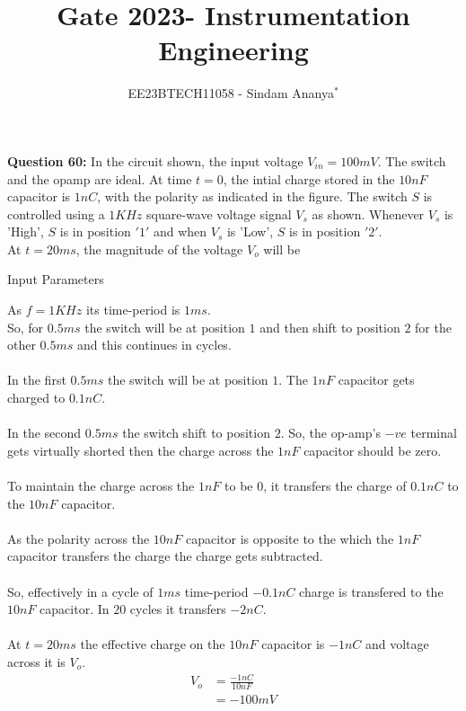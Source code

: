 \documentclass[journal,12pt,twocolumn]{IEEEtran}
\theoremstyle{remark}
\begin{document}

\vspace{3cm}

\title{Gate 2023- Instrumentation Engineering}
\author{EE23BTECH11058 - Sindam Ananya$^{*}$%
}
\maketitle
\newpage
\bigskip

\renewcommand{\thefigure}{\theenumi}
\renewcommand{\thetable}{\theenumi}

\vspace{3cm}
\textbf{Question 60:} 
In the circuit shown, the input voltage $V_{in} = 100mV$. The switch and the opamp are ideal. At time $t=0$, the intial charge stored in the $10nF$ capacitor is $1nC$, with the polarity as indicated in the figure. The switch $S$ is controlled using a $1KHz$ square-wave voltage signal $V_s$ as shown. Whenever $V_s$ is 'High', $S$ is in position $'1'$ and when $V_s$ is 'Low', $S$ is in position $'2'$.\\
At $t = 20ms$, the magnitude of the voltage $V_o$ will be  \\  
\solution
\begin{table}[h!]
    \centering
    
    \caption{Input Parameters}
    \label{tab:gatein60table}
\end{table}
As $f = 1KHz$ its time-period is $1ms$.\\
So, for $0.5ms$ the switch will be at position $1$ and then shift to position $2$ for the other $0.5ms$ and this continues in cycles.\\ \\
In the first $0.5ms$ the switch will be at position $1$. The $1nF$ capacitor gets charged to $0.1nC$.\\ \\
In the second $0.5ms$ the switch shift to position $2$. So, the op-amp's $-ve$ terminal gets virtually shorted then the charge across the $1nF$ capacitor should be zero.\\ \\
To maintain the charge across the $1nF$ to be $0$, it transfers the charge of $0.1nC$ to the $10nF$ capacitor.\\ \\
As the polarity across the $10nF$ capacitor is opposite to the which the $1nF$ capacitor transfers the charge the charge gets subtracted.\\ \\
So, effectively in a cycle of $1ms$ time-period $-0.1nC$ charge is transfered to the $10nF$ capacitor. In $20$ cycles it transfers $-2nC$.\\ \\
At $t=20ms$ the effective charge on the $10nF$ capacitor is $-1nC$ and voltage across it is $V_o$.\\
\begin{align}
V_o &= \frac{-1nC}{10nF}\\
    &= -100mV
\end{align}
\end{document}
